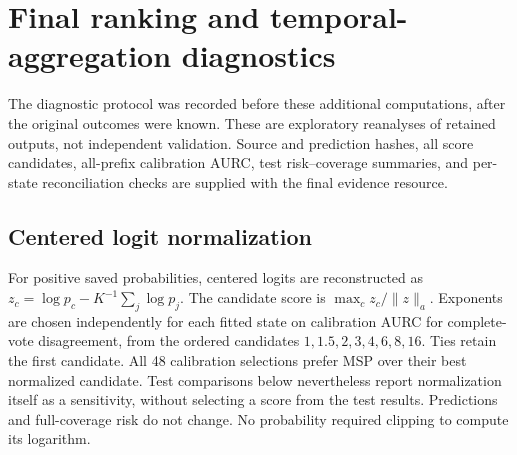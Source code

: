 \clearpage\section{Final ranking and temporal-aggregation diagnostics}
\label{supp:final-diagnostics}
The diagnostic protocol was recorded before these additional computations, after the original outcomes were known. These are exploratory reanalyses of retained outputs, not independent validation. Source and prediction hashes, all score candidates, all-prefix calibration AURC, test risk--coverage summaries, and per-state reconciliation checks are supplied with the final evidence resource.

\subsection{Centered logit normalization}
For positive saved probabilities, centered logits are reconstructed as $z_c=\log p_c-K^{-1}\sum_j\log p_j$. The candidate score is $\max_c z_c/\lVert z\rVert_a$. Exponents are chosen independently for each fitted state on calibration AURC for complete-vote disagreement, from the ordered candidates $1,1.5,2,3,4,6,8,16$. Ties retain the first candidate. All 48 calibration selections prefer MSP over their best normalized candidate. Test comparisons below nevertheless report normalization itself as a sensitivity, without selecting a score from the test results. Predictions and full-coverage risk do not change. No probability required clipping to compute its logarithm.


